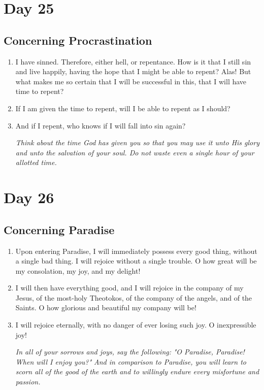\documentclass[11pt]{article}
\begin{document}
\section{Day 25}
\label{sec:org94ed8dd}
\subsection{Concerning Procrastination}
\label{sec:orgaf11bff}
\begin{enumerate}
\item I have sinned. Therefore, either hell, or repentance. How is it that I still sin and live happily, having the hope that I might be able to repent? Alas! But what makes me so certain that I will be successful in this, that I will have time to repent?
\item If I am given the time to repent, will I be able to repent as I should?
\item And if I repent, who knows if I will fall into sin again?

\emph{Think about the time God has given you so that you may use it unto His glory and unto the salvation of your soul. Do not waste even a single hour of your allotted time.}
\end{enumerate}
\section{Day 26}
\label{sec:org73031c5}
\subsection{Concerning Paradise}
\label{sec:org1cec323}
\begin{enumerate}
\item Upon entering Paradise, I will immediately possess every good thing, without a single bad thing. I will rejoice without a single trouble. O how great will be my consolation, my joy, and my delight!
\item I will then have everything good, and I will rejoice in the company of my Jesus, of the most-holy Theotokos, of the company of the angels, and of the Saints. O how glorious and beautiful my company will be!
\item I will rejoice eternally, with no danger of ever losing such joy. O inexpressible joy!

\emph{In all of your sorrows and joys, say the following:}
	   \emph{"O Paradise, Paradise! When will I enjoy you?"}
\emph{And in comparison to Paradise, you will learn to scorn all of the good of the earth and to willingly endure every misfortune and passion.}
\end{enumerate}
\end{document}
